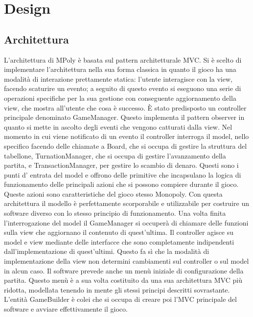 \chapter{Design}

\section{Architettura}
L’architettura di MPoly è basata sul pattern architetturale MVC. 
Si è scelto di implementare l’architettura nella sua forma classica in quanto il gioco 
ha una modalità di interazione prettamente statica: l’utente interagisce con la view, 
facendo scaturire un evento; a seguito di questo evento si eseguono una serie di operazioni 
specifiche per la sua gestione con conseguente aggiornamento della view, che mostra all’utente che cosa è successo.   
È stato predisposto un controller principale denominato GameManager. 
Questo implementa il pattern observer in quanto si mette in ascolto degli eventi che vengono catturati dalla view. 
Nel momento in cui viene notificato di un evento il controller interroga il model, 
nello specifico facendo delle chiamate a Board, che si occupa di gestire la struttura del tabellone,
TurnationManager, che si occupa di gestire l’avanzamento della partita, 
e TransactionManager, per gestire lo scambio di denaro. 
Questi sono i punti d’ entrata del model e offrono delle primitive che incapsulano la logica di funzionamento 
delle principali azioni che si possono compiere durante il gioco. Queste azioni sono caratteristiche del 
gioco stesso Monopoly. 
Con questa architettura il modello è perfettamente scorporabile e utilizzabile per costruire 
un software diverso con lo stesso principio di funzionamento. 
Una volta finita l’interrogazione del model il GameManager si occuperà di chiamare 
delle funzioni sulla view che aggiornano il contenuto di quest’ultima. 
Il controller agisce su model e view mediante delle interfacce che sono completamente indipendenti 
dall’implementazione di quest’ultimi. 
Questo fa sì che la modalità di implementazione della view non determini cambiamenti sul 
controller o sul model in alcun caso. 
Il software prevede anche un menù iniziale di configurazione della partita. 
Questo menù è a sua volta costituito da una sua architettura MVC più ridotta, 
modellata tenendo in mente gli stessi principi descritti sovrastante. 
L’entità GameBuilder è colei che si occupa di creare poi l’MVC principale del software e avviare effettivamente il gioco.

